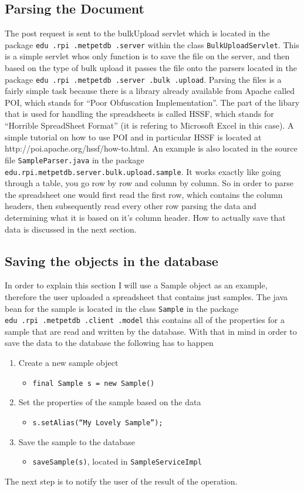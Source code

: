 \documentclass[10pt,letterpaper,onecolumn,oneside]{report}
\begin{document}
\subsection{Parsing the Document}
The post request is sent to the bulkUpload servlet which is located in the package \texttt{edu\ .rpi\ .metpetdb\ .server} within the class \texttt{BulkUploadServlet}. 
 This is a simple servlet whos only function is to save the file on the server, and then based on the type of bulk upload it passes the file onto the parsers located in the package \texttt{edu\ .rpi\ .metpetdb\ .server\ .bulk\ .upload}.  Parsing the files is a fairly simple task because there is a library already available from Apache called POI, which stands for ``Poor Obfuscation Implementation''.  The part of the libary that is used for handling the spreadsheets is called HSSF, which stands for ``Horrible SpreadSheet Format'' (it is refering to Microsoft Excel in this case).  A simple tutorial on how to use POI and in particular HSSF is located at http://poi.apache.org/hssf/how-to.html.  An example is also located in the source file \texttt{SampleParser.java} in the package \texttt{edu.rpi.metpetdb.server.bulk.upload.sample}.  It works exactly like going through a table, you go row by row and column by column.  So in order to parse the spreadsheet one would first read the first row, which contains the column headers, then subsequently read every other row parsing the data and determining what it is based on it's column header.  How to actually save that data is discussed in the next section.
\subsection{Saving the objects in the database}
In order to explain this section I will use a Sample object as an example, therefore the user uploaded a spreadsheet that contains just samples. 
 The java bean for the sample is located in the class \texttt{Sample} in the package \texttt{edu\ .rpi\ .metpetdb\ .client\ .model} this contains all of the properties for a sample that are read and written by the database.  With that in mind in order to save the data to the database the following has to happen
\begin{enumerate}
\item Create a new sample object
\begin{itemize}
\item \texttt{final Sample s = new Sample()}
\end{itemize}
\item Set the properties of the sample based on the data
\begin{itemize}
\item \texttt{s.setAlias(``My Lovely Sample'');}
\end{itemize}
\item Save the sample to the database
\begin{itemize}
\item \texttt{saveSample(s)}, located in \texttt{SampleServiceImpl}
\end{itemize}
\end{enumerate}
The next step is to notify the user of the result of the operation.
\end{document}
